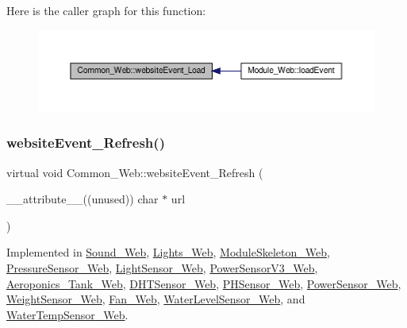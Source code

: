 Here is the caller graph for this function\+:
\nopagebreak
\begin{figure}[H]
\begin{center}
\leavevmode
\includegraphics[width=350pt]{class_common___web_a5ce0d5ce6f63279c3b624371d8a76211_icgraph}
\end{center}
\end{figure}
\mbox{\label{class_common___web_aaca7c54fdcf908e4e1256b7b1f6fc212}} 
\subsubsection{\texorpdfstring{website\+Event\+\_\+\+Refresh()}{websiteEvent\_Refresh()}}
{\footnotesize\ttfamily virtual void Common\+\_\+\+Web\+::website\+Event\+\_\+\+Refresh (\begin{DoxyParamCaption}\item[{\+\_\+\+\_\+attribute\+\_\+\+\_\+((unused)) char $\ast$}]{url }\end{DoxyParamCaption})\hspace{0.3cm}{\ttfamily [pure virtual]}}



Implemented in \hyperlink{class_sound___web_a4b2c5db998fe35455bd3e82ae021d81b}{Sound\+\_\+\+Web}, \hyperlink{class_lights___web_af46bb9ec74ecb0f45b465c2722b9b18a}{Lights\+\_\+\+Web}, \hyperlink{class_module_skeleton___web_a4fbb767613efc275f91eac8e550f1a86}{Module\+Skeleton\+\_\+\+Web}, \hyperlink{class_pressure_sensor___web_adbab0e64b14442162327c42b358779a8}{Pressure\+Sensor\+\_\+\+Web}, \hyperlink{class_light_sensor___web_a6afe75f4f6cec3dc5f44454e23da1f8a}{Light\+Sensor\+\_\+\+Web}, \hyperlink{class_power_sensor_v3___web_aa5516c0a4c5daa0f27a89e86abb0db26}{Power\+Sensor\+V3\+\_\+\+Web}, \hyperlink{class_aeroponics___tank___web_acf883f3ff9b052706ea0548bdf8c04aa}{Aeroponics\+\_\+\+Tank\+\_\+\+Web}, \hyperlink{class_d_h_t_sensor___web_ad02a0f5edd3f948ae81f9ebe6032d443}{D\+H\+T\+Sensor\+\_\+\+Web}, \hyperlink{class_p_h_sensor___web_a73ad3c5be0e9dd8deaea4cf2eee654be}{P\+H\+Sensor\+\_\+\+Web}, \hyperlink{class_power_sensor___web_a430e9c91f3fa760d7930cee367b92125}{Power\+Sensor\+\_\+\+Web}, \hyperlink{class_weight_sensor___web_aa47b67e39e6cbd1b543e482c94160a66}{Weight\+Sensor\+\_\+\+Web}, \hyperlink{class_fan___web_a328af0b2469de198e88f0dd51758a5cb}{Fan\+\_\+\+Web}, \hyperlink{class_water_level_sensor___web_a8caf8178b0128bad72e78c1c662af5c0}{Water\+Level\+Sensor\+\_\+\+Web}, and \hyperlink{class_water_temp_sensor___web_a930d46ab1e337e085a06058d8c07f76b}{Water\+Temp\+Sensor\+\_\+\+Web}.

